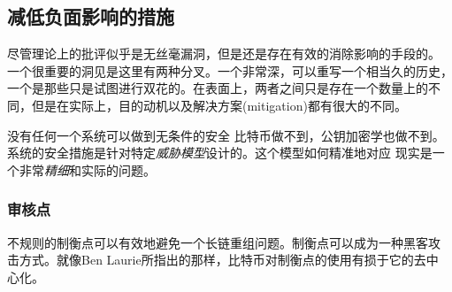 \documentclass[letterpaper]{article}
\begin{document}
\subsection{减低负面影响的措施}

尽管理论上的批评似乎是无丝毫漏洞，但是还是存在有效的消除影响的手段的。
一个很重要的洞见是这里有两种分叉。一个非常深，可以重写一个相当久的历史，
一个是那些只是试图进行双花的。在表面上，两者之间只是存在一个数量上的不
同，但是在实际上，目的动机以及解决方案(mitigation)都有很大的不同。

没有任何一个系统可以做到无条件的安全 比特币做不到，公钥加密学也做不到。
系统的安全措施是针对特定\emph{威胁模型}设计的。这个模型如何精准地对应
现实是一个非常\emph{精细}和实际的问题。

\subsubsection{审核点}
不规则的制衡点可以有效地避免一个长链重组问题。制衡点可以成为一种黑客攻
击方式。就像Ben Laurie所指出的那样，比特币对制衡点的使用有损于它的去中
心化\cite{distrib_impossible}。
\end{document}
